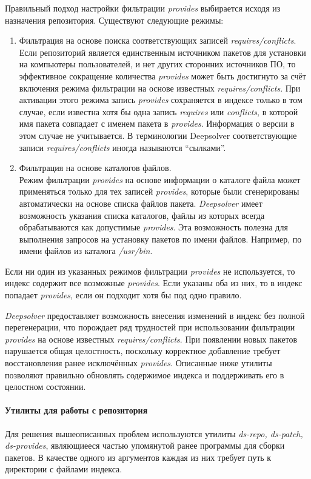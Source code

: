 Правильный подход настройки фильтрации \textit{provides} выбирается исходя
из назначения репозитория. Существуют следующие режимы:
\begin{enumerate}
\item{ Фильтрация на основе поиска соответствующих записей \textit{requires/conflicts}.\\
Если репозиторий является единственным источником пакетов для установки
на компьютеры пользователей, и нет других сторонних источников ПО, 
то эффективное сокращение количества \textit{provides} может быть
достигнуто за счёт включения режима фильтрации на основе известных
\textit{requires/conflicts}. При активации этого режима запись \textit{provides} сохраняется
в индексе только в том случае, если известна хотя бы одна запись
\textit{requires} или \textit{conflicts}, в которой имя пакета совпадает с именем пакета
в \textit{provides}. Информация о версии в этом случае не учитывается. В терминологии 
Deepsolver соответствующие записи \textit{requires/conflicts} иногда называются ``сылками''.}
\item{ Фильтрация на основе каталогов файлов.\\
 Режим фильтрации \textit{provides} на основе информации о каталоге файла может применяться только для
тех записей \textit{provides}, которые были сгенерированы автоматически на основе
 списка файлов пакета. \textit{Deepsolver} имеет возможность указания списка
каталогов, файлы из которых всегда обрабатываются как допустимые
\textit{provides}. Эта возможность полезна для выполнения запросов на установку
 пакетов по имени файлов. Например, по имени файлов из каталога
\textit{/usr/bin}.}
\end{enumerate}
Если ни один из указанных режимов фильтрации \textit{provides} не используется,
то индекс содержит все возможные \textit{provides}. Если указаны оба из них, то
в индекс попадает \textit{provides}, если он подходит хотя бы под одно правило.

\textit{Deepsolver} предоставляет возможность внесения изменений в индекс без
полной перегенерации, что порождает ряд трудностей при использовании
фильтрации \textit{provides} на основе известных \textit{requires/conflicts}. При появлении
новых пакетов нарушается общая целостность, поскольку корректное добавление 
требует восстановления ранее исключённых \textit{provides}. Описанные ниже
утилиты позволяют правильно обновлять содержимое индекса и поддерживать
его в целостном состоянии.

\paragraph{Утилиты для работы с репозитория\\}
Для решения вышеописанных проблем используются утилиты \textit{ds-repo, ds-patch, ds-provides}\cite{deepsolver_um},
являющиееся частью упомянутой ранее программы для сборки пакетов.
В качестве одного из аргументов каждая из них требует путь к директории
 с файлами индекса.\\

